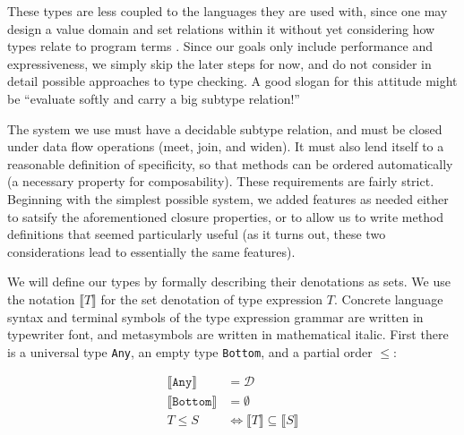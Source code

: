 These types
are less coupled to the languages they are used with, since one may design
a value domain and set relations within it without yet considering how types
relate to program terms \cite{1029823, Castagna:2005:GIS:1069774.1069793}.
Since our goals only include
performance and expressiveness, we simply skip the later steps for now, and do
not consider in detail possible approaches to type checking.
A good slogan for this attitude might be ``evaluate softly and carry a big
subtype relation!''


The system we use
must have a decidable subtype relation, and must be closed under data flow operations
(meet, join, and widen).
It must also lend itself to a reasonable definition of
specificity, so that methods can be ordered automatically (a necessary property for
composability).
These requirements are fairly strict.
Beginning with the simplest possible system, we added features as
needed either to satsify the aforementioned closure properties, or to allow us to
write method definitions that seemed particularly useful (as it turns out, these
two considerations lead to essentially the same features).

We will define our types by formally describing their denotations as sets.
We use the notation $\llbracket T \rrbracket$ for the set denotation of
type expression $T$.
Concrete language syntax and terminal symbols of the type expression grammar
are written in typewriter font, and metasymbols are written in mathematical italic.
First there is a universal type \texttt{Any}, an empty type \texttt{Bottom}, and
a partial order $\leq$:

\vspace{-3ex}
\begin{align*}
  \llbracket \texttt{Any} \rrbracket &= \mathcal{D} \\
  \llbracket \texttt{Bottom} \rrbracket &= \emptyset \\
  T \leq S &\Leftrightarrow \llbracket T \rrbracket \subseteq \llbracket S \rrbracket
\end{align*}

